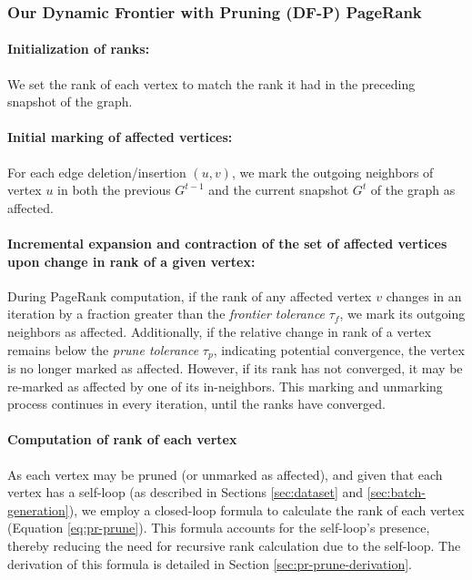 \subsubsection{Our Dynamic Frontier with Pruning (DF-P) PageRank}

\paragraph{Initialization of ranks:}

We set the rank of each vertex to match the rank it had in the preceding snapshot of the graph.

\paragraph{Initial marking of affected vertices:}

For each edge deletion/insertion $(u, v)$, we mark the outgoing neighbors of vertex $u$ in both the previous $G^{t-1}$ and the current snapshot $G^t$ of the graph as affected.

\paragraph{Incremental expansion and contraction of the set of affected vertices upon change in rank of a given vertex:}

During PageRank computation, if the rank of any affected vertex $v$ changes in an iteration by a fraction greater than the \textit{frontier tolerance} $\tau_f$, we mark its outgoing neighbors as affected. Additionally, if the relative change in rank of a vertex remains below the \textit{prune tolerance} $\tau_p$, indicating potential convergence, the vertex is no longer marked as affected. However, if its rank has not converged, it may be re-marked as affected by one of its in-neighbors. This marking and unmarking process continues in every iteration, until the ranks have converged.

\paragraph{Computation of rank of each vertex}

As each vertex may be pruned (or unmarked as affected), and given that each vertex has a self-loop (as described in Sections \ref{sec:dataset} and \ref{sec:batch-generation}), we employ a closed-loop formula to calculate the rank of each vertex (Equation \ref{eq:pr-prune}). This formula accounts for the self-loop's presence, thereby reducing the need for recursive rank calculation due to the self-loop. The derivation of this formula is detailed in Section \ref{sec:pr-prune-derivation}.

